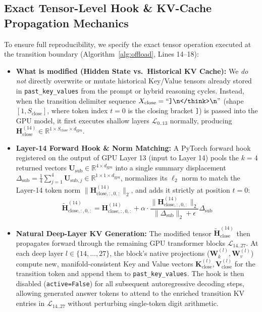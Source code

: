 \documentclass[10pt,twocolumn]{article}
\begin{document}
\subsection{Exact Tensor-Level Hook \& KV-Cache Propagation Mechanics}
\label{sec:injection_spec}
To ensure full reproducibility, we specify the exact tensor operation executed at the transition boundary (Algorithm~\ref{alg:offload}, Lines 14--18):
\begin{itemize}
    \item \textbf{What is modified (Hidden State vs.\ Historical KV Cache):} We \emph{do not} directly overwrite or mutate historical Key/Value tensors already stored in \texttt{past\_key\_values} from the prompt or hybrid reasoning cycles. Instead, when the transition delimiter sequence $X_{\text{close}} = \text{``\texttt{]\textbackslash n</think>\textbackslash n}''}$ (shape $[1, S_{\text{close}}]$, where token index $t = 0$ is the closing bracket \texttt{]}) is passed into the GPU model, it first executes shallow layers $\mathcal{L}_{0..13}$ normally, producing $\mathbf{H}_{\text{close}}^{(14)} \in \mathbb{R}^{1 \times S_{\text{close}} \times d_{\text{gpu}}}$.
    \item \textbf{Layer-14 Forward Hook \& Norm Matching:} A PyTorch forward hook registered on the output of GPU Layer 13 (input to Layer 14) pools the $k=4$ returned vectors $\mathbf{U}_{\text{sub}} \in \mathbb{R}^{4 \times d_{\text{gpu}}}$ into a single summary displacement $\Delta_{\text{sub}} = \frac{1}{4}\sum_{j=1}^4 \mathbf{U}_{\text{sub},j} \in \mathbb{R}^{1 \times 1 \times d_{\text{gpu}}}$, normalizes its $\ell_2$ norm to match the Layer-14 token norm $\|\mathbf{H}_{\text{close}, :, 0, :}^{(14)}\|_2$, and adds it strictly at position $t=0$:
    \begin{equation}
        \tilde{\mathbf{H}}_{\text{close}, :, 0, :}^{(14)} = \mathbf{H}_{\text{close}, :, 0, :}^{(14)} + \alpha \cdot \frac{\|\mathbf{H}_{\text{close}, :, 0, :}^{(14)}\|_2}{\|\Delta_{\text{sub}}\|_2 + \epsilon} \Delta_{\text{sub}}
    \end{equation}
    \item \textbf{Natural Deep-Layer KV Generation:} The modified tensor $\tilde{\mathbf{H}}_{\text{close}}^{(14)}$ then propagates forward through the remaining GPU transformer blocks $\mathcal{L}_{14..27}$. At each deep layer $l \in \{14, \dots, 27\}$, the block's native projections ($\mathbf{W}_k^{(l)}, \mathbf{W}_v^{(l)}$) compute new, manifold-consistent Key and Value vectors $\mathbf{K}_{\text{close}}^{(l)}, \mathbf{V}_{\text{close}}^{(l)}$ for the transition token and append them to \texttt{past\_key\_values}. The hook is then disabled (\texttt{active=False}) for all subsequent autoregressive decoding steps, allowing generated answer tokens to attend to the enriched transition KV entries in $\mathcal{L}_{14..27}$ without perturbing single-token digit arithmetic.
\end{itemize}
\end{document}
